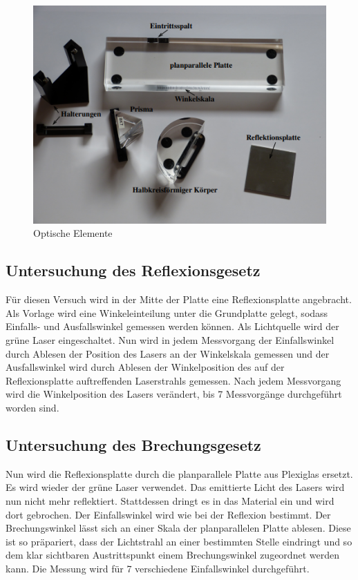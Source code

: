 \begin{figure}[H]
    \centering
    \includegraphics{content/Aufbau2.png}
    \caption{Optische Elemente\cite{V400}}
    \label{fig:Aufbau2}
\end{figure}
\subsection{Untersuchung des Reflexionsgesetz}
Für diesen Versuch wird in der Mitte der Platte eine Reflexionsplatte angebracht.
Als Vorlage wird eine Winkeleinteilung unter die Grundplatte gelegt, sodass Einfalls- und Ausfallswinkel
gemessen werden können. Als Lichtquelle wird der grüne Laser eingeschaltet. Nun wird in jedem Messvorgang
der Einfallswinkel durch Ablesen der Position des Lasers an der Winkelskala gemessen und der Ausfallswinkel wird durch Ablesen
der Winkelposition des auf der Reflexionsplatte auftreffenden Laserstrahls gemessen. Nach jedem Messvorgang wird
die Winkelposition des Lasers verändert, bis 7 Messvorgänge durchgeführt worden sind.
\subsection{Untersuchung des Brechungsgesetz}
Nun wird die Reflexionsplatte durch die planparallele Platte aus Plexiglas ersetzt. Es wird wieder der
grüne Laser verwendet. Das emittierte Licht des Lasers wird nun nicht mehr reflektiert. Stattdessen dringt es in das
Material ein und wird dort gebrochen. Der Einfallswinkel wird wie bei der Reflexion bestimmt. Der Brechungswinkel
lässt sich an einer Skala der planparallelen Platte ablesen. Diese ist so präpariert, dass der Lichtstrahl
an einer bestimmten Stelle eindringt und so dem klar sichtbaren Austrittspunkt einem Brechungswinkel zugeordnet werden kann.
Die Messung wird für 7 verschiedene Einfallswinkel durchgeführt.
